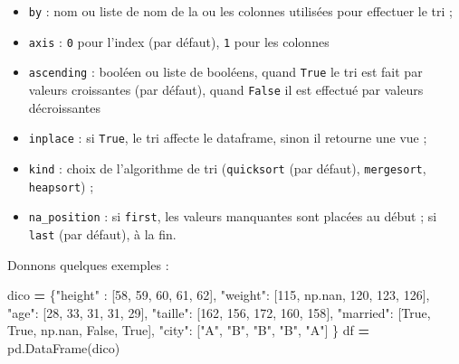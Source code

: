 \documentclass[
  12pt,
]{book}
\newenvironment{Shaded}{\begin{snugshade}}{\end{snugshade}}
\newcommand{\DecValTok}[1]{\textcolor[rgb]{0.00,0.00,0.81}{#1}}
\newcommand{\NormalTok}[1]{#1}
\newcommand{\OperatorTok}[1]{\textcolor[rgb]{0.81,0.36,0.00}{\textbf{#1}}}
\newcommand{\StringTok}[1]{\textcolor[rgb]{0.31,0.60,0.02}{#1}}
\newcommand{\VariableTok}[1]{\textcolor[rgb]{0.00,0.00,0.00}{#1}}
\providecommand{\tightlist}{%
  \setlength{\itemsep}{0pt}\setlength{\parskip}{0pt}}
\numberwithin{equation}{section}
\numberwithin{countremarque}{section}
\begin{document}
\begin{itemize}
\tightlist
\item
  \texttt{by} : nom ou liste de nom de la ou les colonnes utilisées pour effectuer le tri ;
\item
  \texttt{axis} : \texttt{0} pour l'index (par défaut), \texttt{1} pour les colonnes
\item
  \texttt{ascending} : booléen ou liste de booléens, quand \texttt{True} le tri est fait par valeurs croissantes (par défaut), quand \texttt{False} il est effectué par valeurs décroissantes
\item
  \texttt{inplace} : si \texttt{True}, le tri affecte le dataframe, sinon il retourne une vue ;
\item
  \texttt{kind} : choix de l'algorithme de tri (\texttt{quicksort} (par défaut), \texttt{mergesort}, \texttt{heapsort}) ;
\item
  \texttt{na\_position} : si \texttt{first}, les valeurs manquantes sont placées au début ; si \texttt{last} (par défaut), à la fin.
\end{itemize}

Donnons quelques exemples :

\begin{Shaded}
\begin{Highlighting}[]
\NormalTok{dico }\OperatorTok{=}\NormalTok{ \{}\StringTok{"height"}\NormalTok{ : [}\DecValTok{58}\NormalTok{, }\DecValTok{59}\NormalTok{, }\DecValTok{60}\NormalTok{, }\DecValTok{61}\NormalTok{, }\DecValTok{62}\NormalTok{],}
        \StringTok{"weight"}\NormalTok{: [}\DecValTok{115}\NormalTok{, np.nan, }\DecValTok{120}\NormalTok{, }\DecValTok{123}\NormalTok{, }\DecValTok{126}\NormalTok{],}
        \StringTok{"age"}\NormalTok{: [}\DecValTok{28}\NormalTok{, }\DecValTok{33}\NormalTok{, }\DecValTok{31}\NormalTok{, }\DecValTok{31}\NormalTok{, }\DecValTok{29}\NormalTok{],}
        \StringTok{"taille"}\NormalTok{: [}\DecValTok{162}\NormalTok{, }\DecValTok{156}\NormalTok{, }\DecValTok{172}\NormalTok{, }\DecValTok{160}\NormalTok{, }\DecValTok{158}\NormalTok{],}
        \StringTok{"married"}\NormalTok{: [}\VariableTok{True}\NormalTok{, }\VariableTok{True}\NormalTok{, np.nan, }\VariableTok{False}\NormalTok{, }\VariableTok{True}\NormalTok{],}
        \StringTok{"city"}\NormalTok{: [}\StringTok{"A"}\NormalTok{, }\StringTok{"B"}\NormalTok{, }\StringTok{"B"}\NormalTok{, }\StringTok{"B"}\NormalTok{, }\StringTok{"A"}\NormalTok{]}
\NormalTok{       \} }
\NormalTok{df }\OperatorTok{=}\NormalTok{ pd.DataFrame(dico)}
\end{Highlighting}
\end{Shaded}
\end{document}

